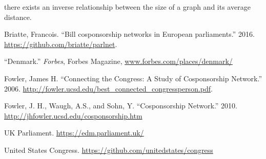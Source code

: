 \documentclass[12pt]{article}
\begin{document}
there exists an inverse relationship between the size of a graph and its average distance. 

\newpage
\begin{thebibliography}{9}

 Briatte, Francois. ``Bill cosponsorship networks in European parliaments.'' 2016. \url{https://github.com/briatte/parlnet}.

 ``Denmark.'' \emph{Forbes}, Forbes Magazine, \url{www.forbes.com/places/denmark/}

 Fowler, James H. ``Connecting the Congress: A Study of Cosponsorship Network.'' 2006. \url{http://fowler.ucsd.edu/best_connected_congressperson.pdf}.

 Fowler, J. H., Waugh, A.S., and Sohn, Y. ``Cosponsorship Network.'' 2010. \url {http://jhfowler.ucsd.edu/cosponsorship.htm}

 UK Parliament. \url{https://edm.parliament.uk/}

 United States Congress. \url{https://github.com/unitedstates/congress}
\end{thebibliography}
\end{document}
